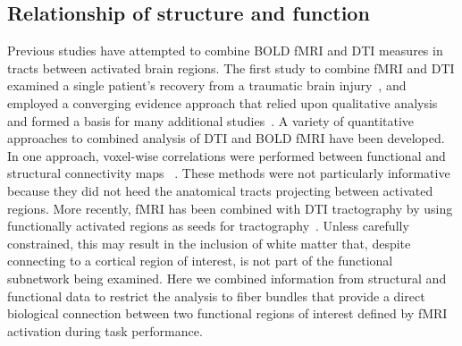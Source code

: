 \documentclass[final,authoryear,5p,times,twocolumn]{elsarticle}
\begin{document}
\subsection{Relationship of structure and function}
Previous studies have attempted to combine BOLD fMRI and DTI measures in tracts between activated brain regions. The first study to combine fMRI and DTI examined a single patient's recovery from a traumatic brain injury~\cite{Werring1998a}, and employed a converging evidence approach that relied upon qualitative analysis and formed a basis for many additional studies~\cite{Werring1999b,Jang2005,Klein2007,Munakata2006,Shinoura2006,Koch2002a}. A variety of quantitative approaches to combined analysis of DTI and BOLD fMRI have been developed. In one approach, voxel-wise correlations were performed between functional and structural connectivity maps ~\cite{Olesen2003,Thomas2009}. These methods were not particularly informative because they did not heed the anatomical tracts projecting between activated regions. More recently, fMRI has been combined with DTI tractography by using functionally activated regions as seeds for tractography~\cite{Toosy2004,Powell2006,Upadhyay2007,Boorman2007,Jenkins2010}. Unless carefully constrained, this may result in the inclusion of white matter that, despite connecting to a cortical region of interest, is not part of the functional subnetwork being examined. Here we combined information from structural and functional data to restrict the analysis to fiber bundles that provide a direct biological connection between two functional regions of interest defined by fMRI activation during task performance. 
\end{document}
